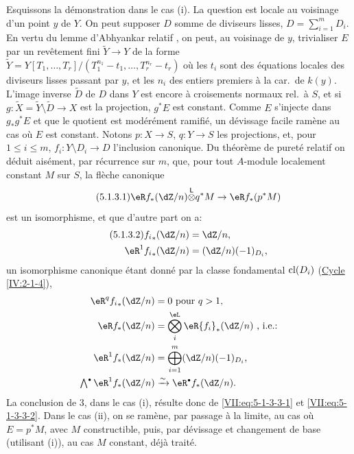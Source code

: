 Esquissons la démonstration dans le cas (i). La question est locale au 
voisinage d'un point $y$ de $Y$. On peut supposer $D$ somme de diviseurs 
lisses, $D=\sum_{i=1}^m D_i$. En vertu du lemme d'Abhyankar relatif 
\cite[XIII 5.5]{sga1}, on peut, au voisinage de $y$, trivialiser $E$ par un 
revêtement fini $\widetilde Y\to Y$ de la forme 
$\widetilde Y=Y[T_1,\dots,T_r]/(T_1^{n_1}-t_1,\dots,T_r^{n_r}-t_r)$ où les 
$t_i$ sont des équations locales des diviseurs lisses passant par $y$, et les 
$n_i$ des entiers premiers à la car.\ de $k(y)$. L'image inverse 
$\widetilde D$ de $D$ dans $Y$ est encore à croisements normaux rel.\ à 
$S$, et si $g:\widetilde X=\widetilde Y\setminus \widetilde D\to X$ est la 
projection, $g^\ast E$ est constant. Comme $E$ s'injecte dans $g_\ast g^\ast E$ 
et que le quotient est modérément ramifié, un dévissage facile ramène 
au cas où $E$ est constant. Notons $p:X\to S$, $q:Y\to S$ les 
projections, et, pour $1\leqslant i\leqslant m$, $f_i:Y\setminus D_i \to D$ 
l'inclusion canonique. Du théorème de pureté relatif \cite[XVI 3.7]{sga4} 
on déduit aisément, par récurrence sur $m$, que, pour tout $A$-module 
localement constant $M$ sur $S$, la flèche canonique 
\begin{equation*}\tag{5.1.3.1}\label{VII:eq:5-1-3-3-1} %
  \eR f_\ast (\dZ/n)\lotimes q^\ast M\to \eR f_\ast (p^\ast M) 
\end{equation*}
est un isomorphisme, et que d'autre part on a: 
\begin{align*}\tag{5.1.3.2}\label{VII:eq:5-1-3-3-2}
  {f_i}_\ast(\dZ/n) &= \dZ/n \text{,} \\
  \eR^1 {f_i}_\ast (\dZ/n) &= (\dZ/n)(-1)_{D_i} \text{,} 
\end{align*}
un isomorphisme canonique étant donné par la classe fondamental $\operatorname{cl}(D_i)$ 
(\hyperref[IV]{Cycle} \ref{IV:2-1-4}), 
\begin{align*}
  \eR^q {f_i}_\ast(\dZ/n) &= 0\text{ pour $q>1$,} \\
  \eR f_\ast (\dZ/n) &= \bigotimes_i^\eL \eR {f_i}_\ast (\dZ/n) \text{ , i.e.:} \\
  \eR^1 f_\ast(\dZ/n) &= \bigoplus_{i=1}^m (\dZ/n)(-1)_{D_i} \text{,} \\
  \textstyle\bigwedge^\bullet \eR^1 f_\ast(\dZ/n) &\iso \eR^\bullet f_\ast (\dZ/n) \text{.} 
\end{align*}
La conclusion de 3, dans le cas (i), résulte donc de 
\eqref{VII:eq:5-1-3-3-1} et \eqref{VII:eq:5-1-3-3-2}. Dans le cas (ii), on se 
ramène, par passage à la limite, au cas où $E=p^\ast M$, avec $M$ 
constructible, puis, par dévissage et changement de base (utilisant (i)), au 
cas $M$ constant, déjà traité. 

